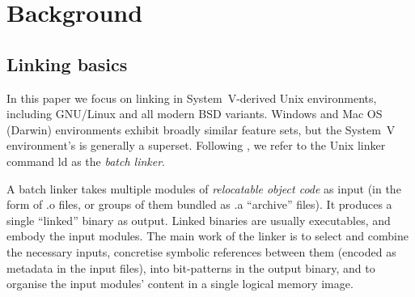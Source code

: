 \section{Background}

% 
% 
% 

\subsection{Linking basics}

In this paper we focus on linking in System~V-derived Unix environments,
including GNU/Linux and all modern BSD variants.
Windows and Mac OS (Darwin) environments exhibit broadly similar feature sets,
but the System~V environment's is generally a superset.
Following \citet{gingell_1987_shared}, we refer to the Unix linker command \textsf{ld}
as the \emph{batch linker}.



A batch linker takes multiple modules of \emph{relocatable object code} 
as input (in the form of \textsf{.o} files, or groups of them bundled as \textsf{.a} ``archive'' files).
It produces a single ``linked'' binary as output.
Linked binaries are usually executables, and embody the input modules.
The main work of the linker is to select and combine the necessary inputs, 
concretise symbolic references between them (encoded as metadata in the input files), 
into bit-patterns in the output binary,
and to organise the input modules' content
in a single logical memory image.

